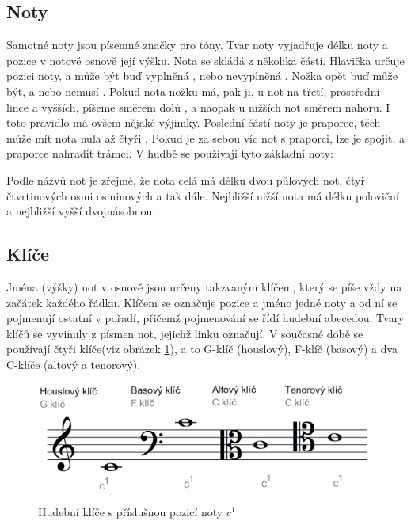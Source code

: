 \subsection*{Noty}
Samotné noty jsou písemné značky pro tóny.
Tvar noty vyjadřuje délku noty a pozice v notové osnově její výšku.
Nota se skládá z několika částí.
Hlavička určuje pozici noty, a může být buď vyplněná , nebo nevyplněná . 
Nožka opět buď může být, a nebo nemusí . 
Pokud nota nožku má, pak ji, u not na třetí, prostřední lince a vyšších, píšeme směrem dolů ,
a naopak u nižších not směrem nahoru.
I toto pravidlo má ovšem nějaké výjimky.
Poslední částí noty je praporec, těch může mít nota nula až čtyři .
Pokud je za sebou víc not s praporci, lze je spojit, a praporce nahradit trámci.
V hudbě se používají tyto základní noty:



Podle názvů not je zřejmé, že nota celá má délku dvou půlových not, 
čtyř čtvrtinových osmi osminových a tak dále.
Nejbližší nižší nota má délku poloviční a nejbližší vyšší dvojnásobnou.
\par

\subsection*{Klíče}
Jména (výšky) not v osnově jsou určeny takzvaným klíčem, 
který se píše vždy na začátek každého řádku.
Klíčem se označuje pozice a jméno jedné noty a od ní se pojmenují ostatní v pořadí, 
přičemž pojmenování se řídí hudební abecedou.
Tvary klíčů se vyvinuly z písmen not, jejichž linku označují.
V současné době se používají čtyři klíče(viz obrázek \ref{obrazek4Klice}), 
a to G-klíč (houslový), F-klíč (basový) a dva C-klíče (altový a tenorový).

\begin{figure}[h]\centering
    \centering
    \includegraphics[width=0.6\linewidth]{obrazky/Klíče.png}\\[1pt]  
    \caption{Hudební klíče s příslušnou pozicí noty $c^1$}    
    \label{obrazek4Klice}
\end{figure}



